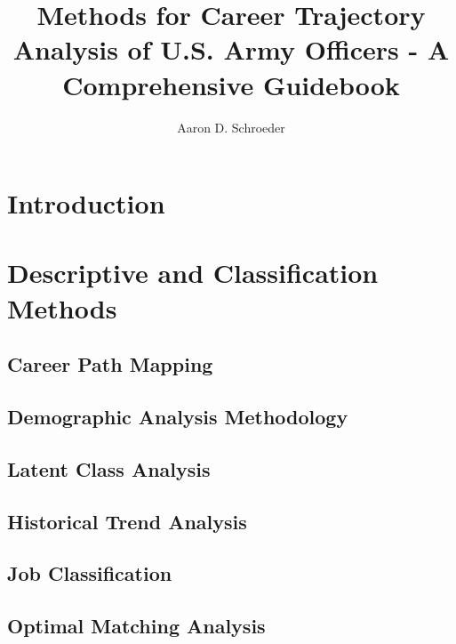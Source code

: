 \documentclass[man]{apa7}
\title{Methods for Career Trajectory Analysis of U.S. Army Officers - A Comprehensive Guidebook}
\author{Aaron D. Schroeder}
\affiliation{University of Virginia}
\date{}
\begin{document}
\maketitle

\singlespacing
\tableofcontents

\doublespacing

\newpage
\section{Introduction}


\newpage
\section{Descriptive and Classification Methods}


\subsection{Career Path Mapping}


\subsection{Demographic Analysis Methodology}


\subsection{Latent Class Analysis}


\subsection{Historical Trend Analysis}


\subsection{Job Classification}


\subsection{Optimal Matching Analysis}

\end{document}
